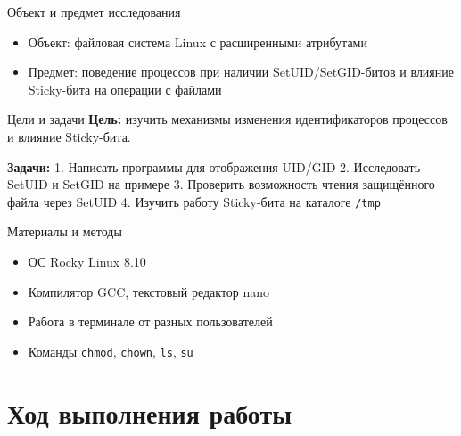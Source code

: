 \documentclass[
  ignorenonframetext,
  aspectratio=169,
  russian,
]{beamer}
\providecommand{\tightlist}{%
  \setlength{\itemsep}{0pt}\setlength{\parskip}{0pt}}
\begin{document}
\begin{frame}{Объект и предмет исследования}
\label{ux43eux431ux44aux435ux43aux442-ux438-ux43fux440ux435ux434ux43cux435ux442-ux438ux441ux441ux43bux435ux434ux43eux432ux430ux43dux438ux44f}
\begin{itemize}[<+->]
\tightlist
\item
  Объект: файловая система Linux с расширенными атрибутами
\item
  Предмет: поведение процессов при наличии SetUID/SetGID-битов и влияние
  Sticky-бита на операции с файлами
\end{itemize}
\end{frame}

\begin{frame}[fragile]{Цели и задачи}
\label{ux446ux435ux43bux438-ux438-ux437ux430ux434ux430ux447ux438}
\textbf{Цель:} изучить механизмы изменения идентификаторов процессов и
влияние Sticky-бита.

\textbf{Задачи:} 1. Написать программы для отображения UID/GID 2.
Исследовать SetUID и SetGID на примере 3. Проверить возможность чтения
защищённого файла через SetUID 4. Изучить работу Sticky-бита на каталоге
\texttt{/tmp}
\end{frame}

\begin{frame}[fragile]{Материалы и методы}
\label{ux43cux430ux442ux435ux440ux438ux430ux43bux44b-ux438-ux43cux435ux442ux43eux434ux44b}
\begin{itemize}[<+->]
\tightlist
\item
  ОС Rocky Linux 8.10
\item
  Компилятор GCC, текстовый редактор nano
\item
  Работа в терминале от разных пользователей
\item
  Команды \texttt{chmod}, \texttt{chown}, \texttt{ls}, \texttt{su}
\end{itemize}
\end{frame}

\section{Ход выполнения
работы}\label{ux445ux43eux434-ux432ux44bux43fux43eux43bux43dux435ux43dux438ux44f-ux440ux430ux431ux43eux442ux44b}
\end{document}
